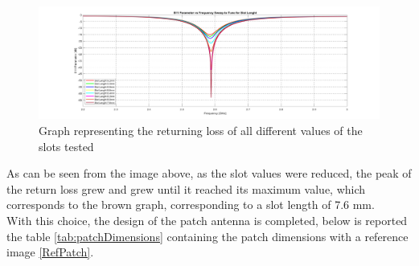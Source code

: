 \documentclass[]{article}
\begin{document}
  
  \begin{figure}[h]
  	\centering
  	\includegraphics[width=1.0\linewidth]{img/img10}
  	\caption{Graph representing the returning loss of all different values of the slots tested}
  	\label{GSsweep}
  \end{figure}
  As can be seen from the image above, as the slot values were reduced, the peak of the return loss grew and grew until it reached its maximum value, which corresponds to the brown graph, corresponding to a slot length of 7.6 mm.\\
  With this choice, the design of the patch antenna is completed, below is reported the table \eqref{tab:patchDimensions} containing the patch dimensions with a reference image \eqref{RefPatch}.\\
\end{document}
